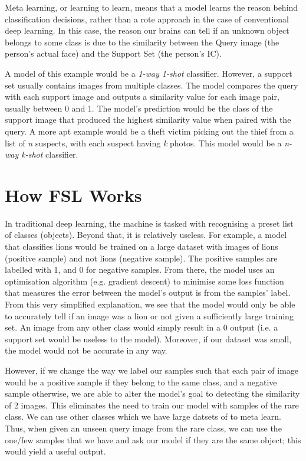 \documentclass[12pt, letterpaper]{article}
\begin{document}
    Meta learning, or learning to learn, means that a model learns the reason behind classification decisions, rather than a rote approach in the case of conventional deep learning. In this case, the reason our brains can tell if an unknown object belongs to some class is due to the similarity between the Query image (the person's actual face) and the Support Set (the person's IC).

    A model of this example would be a \textit{1-way 1-shot} classifier. However, a support set usually contains images from multiple classes. The model compares the query with each support image and outputs a similarity value for each image pair, usually between 0 and 1. The model's prediction would be the class of the support image that produced the highest similarity value when paired with the query. A more apt example would be a theft victim picking out the thief from a list of \textit{n} suspects, with each suspect having \textit{k} photos. This model would be a \textit{n-way k-shot} classifier.


\section{How FSL Works}
    In traditional deep learning, the machine is tasked with recognising a preset list of classes (objects). Beyond that, it is relatively useless. For example, a model that classifies lions would be trained on a large dataset with images of lions (positive sample) and not lions (negative sample). The positive samples are labelled with 1, and 0 for negative samples. From there, the model uses an optimisation algorithm (e.g. gradient descent) to minimise some loss function that measures the error between the model's output is from the samples' label. From this very simplified explanation, we see that the model would only be able to accurately tell if an image was a lion or not given a sufficiently large training set. An image from any other class would simply result in a 0 output (i.e. a support set would be useless to the model). Moreover, if our dataset was small, the model would not be accurate in any way.

    However, if we change the way we label our samples such that each pair of image would be a positive sample if they belong to the same class, and a negative sample otherwise, we are able to alter the model's goal to detecting the similarity of 2 images. This eliminates the need to train our model with samples of the rare class. We can use other classes which we have large datsets of to meta learn. Thus, when given an unseen query image from the rare class, we can use the one/few samples that we have and ask our model if they are the same object; this would yield a useful output.
\end{document}
